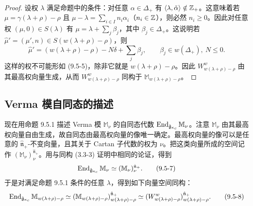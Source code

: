 \begin{proof}
    设权 $\lambda$ 满足命题中的条件：对任意 $\alpha\in\Delta_+$ 有 $\langle\lambda,\check\alpha\rangle\notin\mathbb{Z}_+$。这意味着若 $\mu=\gamma(\lambda+\rho)-\rho$ 且 $\mu-\lambda=\sum_{i\in I}n_i\alpha_i$（$n_i\in\mathbb{Z}$），则必然 $n_i\ge0$。因此对任意权 $(\mu,0)\in S(\lambda)$ 有 $\mu=\lambda+\sum_j\beta_j$，其中 $\beta_j\in\Delta_+$。这说明若 $\hat\mu'=(\mu',n)\in S(w(\lambda+\rho)-\rho)$，则
    \[
        \hat\mu'=(w(\lambda+\rho)-\rho)-N\delta+\sum_j\beta_j,
        \qquad \beta_j\in w(\Delta_+),\ N\le0.
    \]
    这样的权不可能形如 (9.5-5)，除非它就是 $w(\lambda+\rho)-\rho$。因此 $W^w_{w(\lambda+\rho)-\rho}$ 由其最高权向量生成，从而 $W^w_{w(\lambda+\rho)-\rho}$ 同构于 $\mathbb{M}_{w(\lambda+\rho)-\rho}$。
\end{proof}


\subsection{Verma 模自同态的描述}

现在用命题 9.5.1 描述 Verma 模 $\mathbb{M}_\nu$ 的自同态代数 $\operatorname{End}_{\hat{\mathfrak{g}}_{\kappa_c}}\mathbb{M}_\nu$。注意 $\mathbb{M}_\nu$ 由其最高权向量自由生成，故自同态由最高权向量的像唯一确定。最高权向量的像可以是任意的 $\hat{\mathfrak{n}}_+$-不变向量，且其关于 Cartan 子代数的权为 $\nu$。把这类向量所成的空间记作 $(\mathbb{M}_\nu)^{\hat{\mathfrak{n}}_+}_\nu$。用与同构 (3.3-3) 证明中相同的论证，得到
\begin{equation}
    \operatorname{End}_{\hat{\mathfrak{g}}_{\kappa_c}}\mathbb{M}_\nu\simeq(\mathbb{M}_\nu)^{\hat{\mathfrak{n}}_+}_\nu .
    \tag{9.5-7}
\end{equation}
于是对满足命题 9.5.1 条件的任意 $\lambda$，得到如下向量空间同构：
\begin{equation}
    \operatorname{End}_{\hat{\mathfrak{g}}_{\kappa_c}}\mathbb{M}_{w(\lambda+\rho)-\rho}
    \simeq(\mathbb{M}_{w(\lambda+\rho)-\rho})^{\hat{\mathfrak{n}}_+}_{w(\lambda+\rho)-\rho}
    \simeq(W^w_{w(\lambda+\rho)-\rho})^{\hat{\mathfrak{n}}_+}_{w(\lambda+\rho)-\rho}.
    \tag{9.5-8}
\end{equation}

